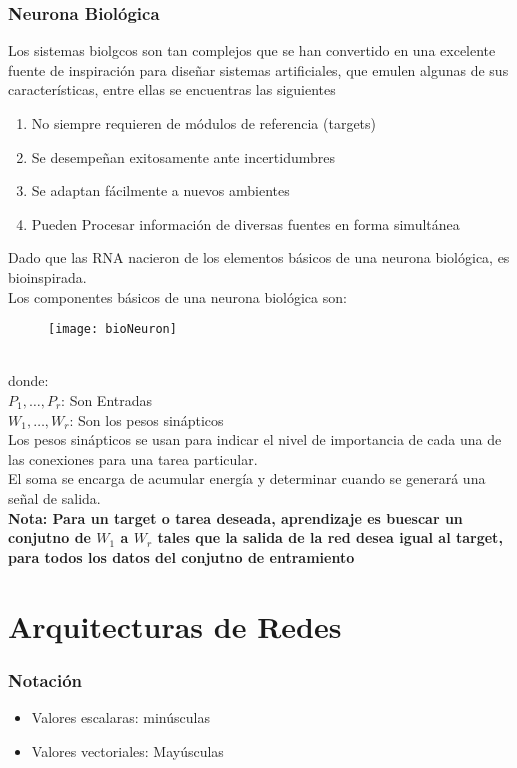 \documentclass{article}
\begin{document}
\section{Neurona Biológica}
Los sistemas biolgcos son tan complejos que se han convertido en una excelente fuente de inspiración para diseñar sistemas artificiales, que emulen algunas de sus características, entre ellas se encuentras las siguientes
\begin{enumerate}
	\item No siempre requieren de módulos de referencia (targets)
	\item Se desempeñan exitosamente ante incertidumbres
	\item Se adaptan fácilmente a nuevos ambientes
	\item Pueden Procesar información de diversas fuentes en forma simultánea
\end{enumerate}
Dado que las RNA nacieron de los elementos básicos de una neurona biológica, es bioinspirada.\\
Los componentes básicos de una neurona biológica son:\\
\begin{figure}[h!]
	\texttt{[image: bioNeuron]}
\end{figure}\\
donde:\\
$P_1,\ldots,P_r$: Son Entradas\\
$W_1, \ldots, W_r$: Son los pesos sinápticos\\
Los pesos sinápticos se usan para indicar el nivel de importancia de cada una de las conexiones para una tarea particular.\\
El soma se encarga de acumular energía y determinar cuando se generará una señal de salida.\\
\textbf{Nota: Para un target o tarea deseada, aprendizaje es buescar un conjutno de $W_1$ a $W_r$ tales que la salida de la red desea igual al target, para todos los datos del conjutno de entramiento}
\part{Arquitecturas de Redes}
\section{Notación}
\begin{itemize}
	\item Valores escalaras: minúsculas
	\item Valores vectoriales: Mayúsculas
\end{itemize}
\end{document}
